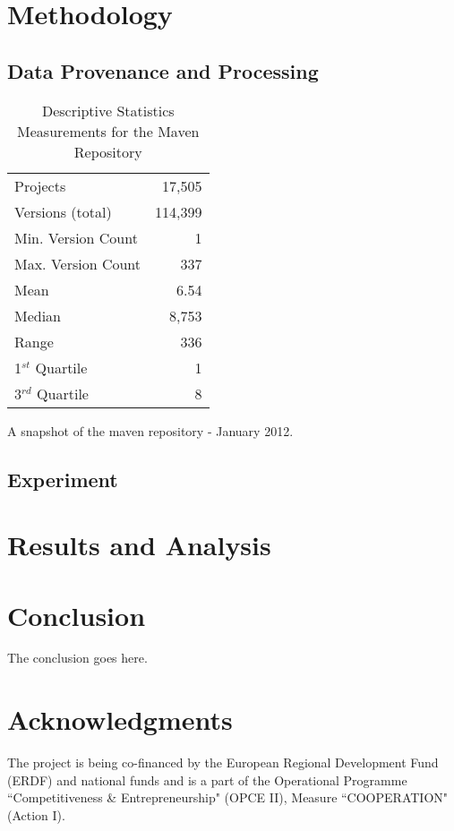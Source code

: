 \documentclass[conference]{IEEEtran}
\begin{document}
\section{Methodology}
\label{sec:meth}

\subsection{Data Provenance and Processing}
\label{sec:data}

\begin{table}
\centering
\caption{Descriptive Statistics Measurements for the Maven Repository}
\label{tbl:repository}
\begin{tabular}{l r}
 \hline
Projects & 17,505\\
Versions (total) & 114,399\\
Min. Version Count & 1\\
Max. Version Count & 337\\
Mean & 6.54\\
Median & 8,753\\
Range & 336\\
1$^{st}$ Quartile & 1\\
3$^{rd}$ Quartile & 8\\
\hline
\end{tabular}
\end{table}

A snapshot of the maven repository - January 2012.

\subsection{Experiment}
\label{sec:exp}

\section{Results and Analysis}
\label{sec:res}

\section{Conclusion}
\label{sec:con}
The conclusion goes here.

\section*{Acknowledgments}

The project is being co-financed by the European Regional Development Fund (ERDF)
and national funds and is a part of the Operational Programme ``Competitiveness \&
Entrepreneurship" (OPCE II), Measure ``COOPERATION" (Action I).


 
\end{document}
